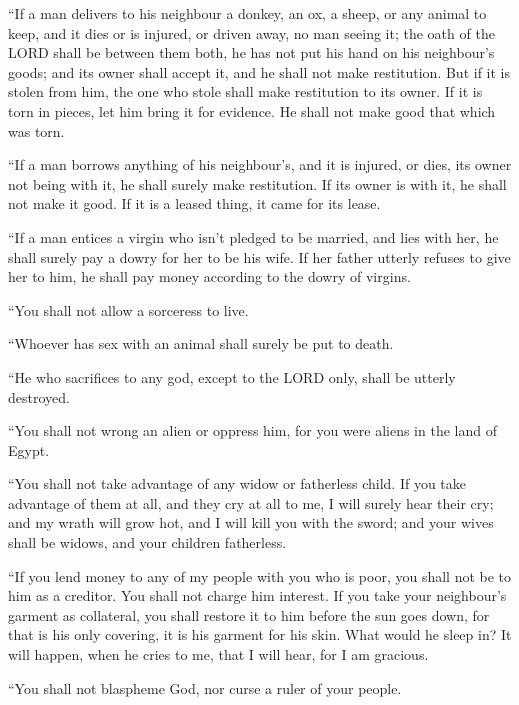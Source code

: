  ``If a man delivers to his neighbour a donkey, an ox, a
sheep, or any animal to keep, and it dies or is injured, or driven away,
no man seeing it;  the oath of the LORD shall be between
them both, he has not put his hand on his neighbour's goods; and its
owner shall accept it, and he shall not make restitution. 
But if it is stolen from him, the one who stole shall make restitution
to its owner.  If it is torn in pieces, let him bring it
for evidence. He shall not make good that which was torn.

 ``If a man borrows anything of his neighbour's, and it is
injured, or dies, its owner not being with it, he shall surely make
restitution.  If its owner is with it, he shall not make it
good. If it is a leased thing, it came for its lease.

 ``If a man entices a virgin who isn't pledged to be
married, and lies with her, he shall surely pay a dowry for her to be
his wife.  If her father utterly refuses to give her to
him, he shall pay money according to the dowry of virgins.

 ``You shall not allow a sorceress to live.

 ``Whoever has sex with an animal shall surely be put to
death.

 ``He who sacrifices to any god, except to the LORD only,
shall be utterly destroyed.

 ``You shall not wrong an alien or oppress him, for you
were aliens in the land of Egypt.

 ``You shall not take advantage of any widow or fatherless
child.  If you take advantage of them at all, and they cry
at all to me, I will surely hear their cry;  and my wrath
will grow hot, and I will kill you with the sword; and your wives shall
be widows, and your children fatherless.

 ``If you lend money to any of my people with you who is
poor, you shall not be to him as a creditor. You shall not charge him
interest.  If you take your neighbour's garment as
collateral, you shall restore it to him before the sun goes down,
 for that is his only covering, it is his garment for his
skin. What would he sleep in? It will happen, when he cries to me, that
I will hear, for I am gracious.

 ``You shall not blaspheme God, nor curse a ruler of your
people.

